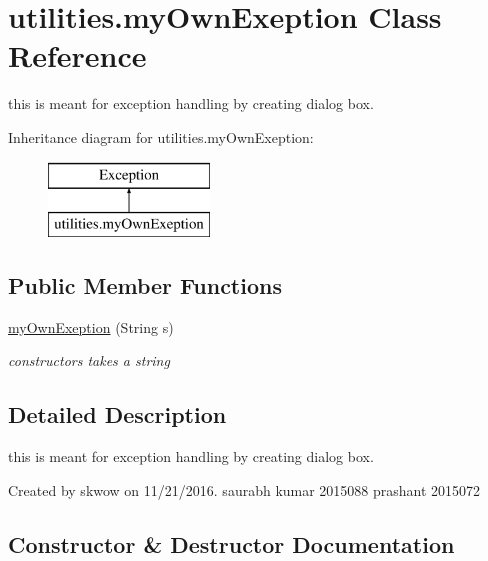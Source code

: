 \hypertarget{classutilities_1_1my_own_exeption}{}\section{utilities.\+my\+Own\+Exeption Class Reference}
\label{classutilities_1_1my_own_exeption}


this is meant for exception handling by creating dialog box.  


Inheritance diagram for utilities.\+my\+Own\+Exeption\+:\begin{figure}[H]
\begin{center}
\leavevmode
\includegraphics[height=2.000000cm]{classutilities_1_1my_own_exeption}
\end{center}
\end{figure}
\subsection*{Public Member Functions}
\begin{DoxyCompactItemize}
\item 
\hyperlink{classutilities_1_1my_own_exeption_a06cbd6448612ea5d4067e4b2a47acd09}{my\+Own\+Exeption} (String s)
\begin{DoxyCompactList}\small\item\em constructors takes a string \end{DoxyCompactList}\end{DoxyCompactItemize}


\subsection{Detailed Description}
this is meant for exception handling by creating dialog box. 

Created by skwow on 11/21/2016. saurabh kumar 2015088 prashant 2015072 

\subsection{Constructor \& Destructor Documentation}
\hypertarget{classutilities_1_1my_own_exeption_a06cbd6448612ea5d4067e4b2a47acd09}{}\label{classutilities_1_1my_own_exeption_a06cbd6448612ea5d4067e4b2a47acd09} 
